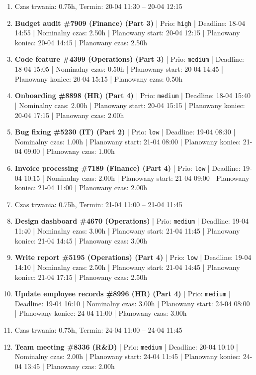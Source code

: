 {\begin{enumerate}
  \item [\textbf{PRZERWA}] Czas trwania: 0.75h, Termin: 20-04 11:30 -- 20-04 12:15
  \item [\textbf{14616}] \textbf{Budget audit \#7909 (Finance) (Part 3)} | Prio: \texttt{high} | Deadline: 18-04 14:55 | Nominalny czas: 2.50h | Planowany start: 20-04 12:15 | Planowany koniec: 20-04 14:45 | Planowany czas: 2.50h
  \item [\textbf{14664}] \textbf{Code feature \#4399 (Operations) (Part 3)} | Prio: \texttt{medium} | Deadline: 18-04 15:05 | Nominalny czas: 0.50h | Planowany start: 20-04 14:45 | Planowany koniec: 20-04 15:15 | Planowany czas: 0.50h
  \item [\textbf{14636}] \textbf{Onboarding \#8898 (HR) (Part 4)} | Prio: \texttt{medium} | Deadline: 18-04 15:40 | Nominalny czas: 2.00h | Planowany start: 20-04 15:15 | Planowany koniec: 20-04 17:15 | Planowany czas: 2.00h
  \item [\textbf{14680}] \textbf{Bug fixing \#5230 (IT) (Part 2)} | Prio: \texttt{low} | Deadline: 19-04 08:30 | Nominalny czas: 1.00h | Planowany start: 21-04 08:00 | Planowany koniec: 21-04 09:00 | Planowany czas: 1.00h
  \item [\textbf{14678}] \textbf{Invoice processing \#7189 (Finance) (Part 4)} | Prio: \texttt{low} | Deadline: 19-04 10:15 | Nominalny czas: 2.00h | Planowany start: 21-04 09:00 | Planowany koniec: 21-04 11:00 | Planowany czas: 2.00h
  \item [\textbf{PRZERWA}] Czas trwania: 0.75h, Termin: 21-04 11:00 -- 21-04 11:45
  \item [\textbf{14676}] \textbf{Design dashboard \#4670 (Operations)} | Prio: \texttt{medium} | Deadline: 19-04 11:40 | Nominalny czas: 3.00h | Planowany start: 21-04 11:45 | Planowany koniec: 21-04 14:45 | Planowany czas: 3.00h
  \item [\textbf{14687}] \textbf{Write report \#5195 (Operations) (Part 4)} | Prio: \texttt{low} | Deadline: 19-04 14:10 | Nominalny czas: 2.50h | Planowany start: 21-04 14:45 | Planowany koniec: 21-04 17:15 | Planowany czas: 2.50h
  \item [\textbf{14655}] \textbf{Update employee records \#8996 (HR) (Part 4)} | Prio: \texttt{medium} | Deadline: 19-04 16:10 | Nominalny czas: 3.00h | Planowany start: 24-04 08:00 | Planowany koniec: 24-04 11:00 | Planowany czas: 3.00h
  \item [\textbf{PRZERWA}] Czas trwania: 0.75h, Termin: 24-04 11:00 -- 24-04 11:45
  \item [\textbf{14649}] \textbf{Team meeting \#8336 (R\&D)} | Prio: \texttt{medium} | Deadline: 20-04 10:10 | Nominalny czas: 2.00h | Planowany start: 24-04 11:45 | Planowany koniec: 24-04 13:45 | Planowany czas: 2.00h

\end{enumerate}}
